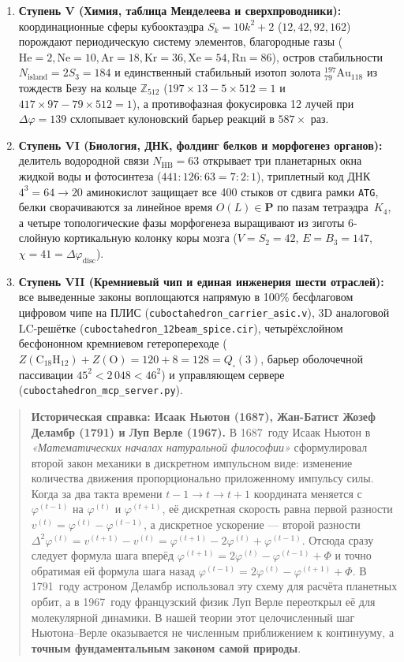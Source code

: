 \begin{enumerate}[leftmargin=*]
\item \textbf{Ступень V (Химия, таблица Менделеева и сверхпроводники):}
  координационные сферы кубооктаэдра $S_k = 10k^2 + 2$ ($12, 42, 92, 162$) порождают периодическую систему элементов, благородные газы ($\mathrm{He}=2, \mathrm{Ne}=10, \mathrm{Ar}=18, \mathrm{Kr}=36, \mathrm{Xe}=54, \mathrm{Rn}=86$), остров стабильности $N_{\mathrm{island}} = 2S_3 = 184$ и единственный стабильный изотоп золота $^{197}_{79}\mathrm{Au}_{118}$ из тождеств Безу на кольце $\mathbb{Z}_{512}$ ($197\times 13 - 5\times 512 = 1$ и $417\times 97 - 79\times 512 = 1$), а противофазная фокусировка 12 лучей при $\Delta\varphi = 139$ схлопывает кулоновский барьер реакций в $587\times$ раз.
\item \textbf{Ступень VI (Биология, ДНК, фолдинг белков и морфогенез органов):}
  делитель водородной связи $N_{\mathrm{HB}} = 63$ открывает три планетарных окна жидкой воды и фотосинтеза ($441 : 126 : 63 = 7 : 2 : 1$), триплетный код ДНК $4^3 = 64 \to 20$ аминокислот защищает все 400 стыков от сдвига рамки \texttt{ATG}, белки сворачиваются за линейное время $O(L)\in\mathbf{P}$ по пазам тетраэдра~$K_4$, а четыре топологические фазы морфогенеза выращивают из зиготы 6-слойную кортикальную колонку коры мозга ($V = S_2 = 42$, $E = B_3 = 147$, $\chi = 41 = \Delta\varphi_{\mathrm{disc}}$).
\item \textbf{Ступень VII (Кремниевый чип и единая инженерия шести отраслей):}
  все выведенные законы воплощаются напрямую в 100\% бесфлаговом цифровом чипе на ПЛИС (\texttt{cuboctahedron\_carrier\_asic.v}), 3D аналоговой LC-решётке (\texttt{cuboctahedron\_12beam\_spice.cir}), четырёхслойном бесфононном кремниевом гетеропереходе ($Z(\mathrm{C_{18}H_{12}})+Z(\mathrm{O}) = 120 + 8 = 128 = Q_\square(3)$, барьер оболочечной пассивации $45^2 < 2\,048 < 46^2$) и управляющем сервере (\texttt{cuboctahedron\_mcp\_server.py}).
\end{enumerate}

\begin{quote}
\small\textbf{Историческая справка: Исаак Ньютон (1687), Жан-Батист Жозеф Деламбр (1791) и Луп Верле (1967).}
В 1687~году Исаак Ньютон в \emph{«Математических началах натуральной философии»} сформулировал второй закон механики в дискретном импульсном виде: изменение количества движения пропорционально приложенному импульсу силы. Когда за два такта времени $t-1 \to t \to t+1$ координата меняется с $\varphi^{(t-1)}$ на $\varphi^{(t)}$ и $\varphi^{(t+1)}$, её дискретная скорость равна первой разности $v^{(t)} = \varphi^{(t)} - \varphi^{(t-1)}$, а дискретное ускорение --- второй разности $\Delta^2\varphi^{(t)} = v^{(t+1)} - v^{(t)} = \varphi^{(t+1)} - 2\varphi^{(t)} + \varphi^{(t-1)}$. Отсюда сразу следует формула шага вперёд $\varphi^{(t+1)} = 2\varphi^{(t)} - \varphi^{(t-1)} + \Phi$ и точно обратимая ей формула шага назад $\varphi^{(t-1)} = 2\varphi^{(t)} - \varphi^{(t+1)} + \Phi$. В 1791~году астроном Деламбр использовал эту схему для расчёта планетных орбит, а в 1967~году французский физик Луп Верле переоткрыл её для молекулярной динамики. В нашей теории этот целочисленный шаг Ньютона--Верле оказывается не численным приближением к континууму, а \textbf{точным фундаментальным законом самой природы}.
\end{quote}

